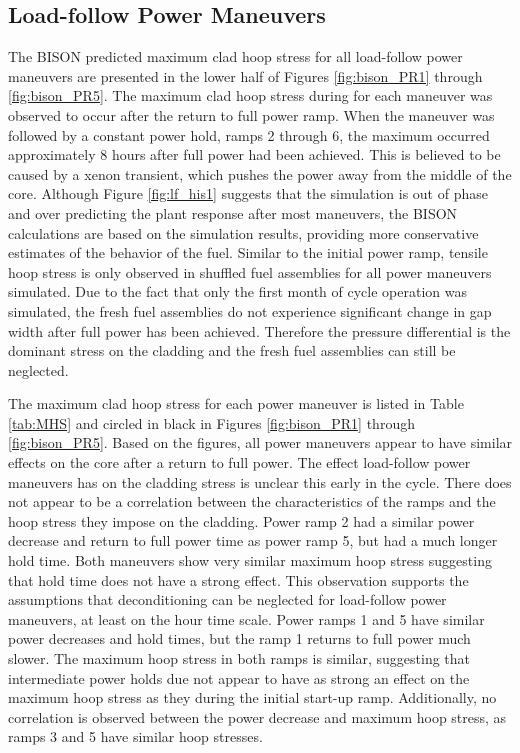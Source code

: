 \documentclass[edeposit,fullpage,11pt]{uiucthesis2009}
\begin{document}
\subsection{Load-follow Power Maneuvers}

The BISON predicted maximum clad hoop stress for all load-follow power maneuvers are presented in the lower half of Figures \ref{fig:bison_PR1} through \ref{fig:bison_PR5}.
The maximum clad hoop stress during for each maneuver was observed to occur after the return to full power ramp.
When the maneuver was followed by a constant power hold, ramps 2 through 6, the maximum occurred approximately 8 hours after full power had been achieved.
This is believed to be caused by a xenon transient, which pushes the power away from the middle of the core.
Although Figure \ref{fig:lf_his1} suggests that the simulation is out of phase and over predicting the plant response after most maneuvers, the BISON calculations are based on the simulation results, providing more conservative estimates of the behavior of the fuel.
Similar to the initial power ramp, tensile hoop stress is only observed in shuffled fuel assemblies for all power maneuvers simulated.
Due to the fact that only the first month of cycle operation was simulated, the fresh fuel assemblies do not experience significant change in gap width after full power has been achieved.
Therefore the pressure differential is the dominant stress on the cladding and the fresh fuel assemblies can still be neglected.

The maximum clad hoop stress for each power maneuver is listed in Table \ref{tab:MHS} and circled in black in Figures \ref{fig:bison_PR1} through \ref{fig:bison_PR5}. 
Based on the figures, all power maneuvers appear to have similar effects on the core after a return to full power.
The effect load-follow power maneuvers has on the cladding stress is unclear this early in the cycle.
There does not appear to be a correlation between the characteristics of the ramps and the hoop stress they impose on the cladding.
Power ramp 2 had a similar power decrease and return to full power time as power ramp 5, but had a much longer hold time.
Both maneuvers show very similar maximum hoop stress suggesting that hold time does not have a strong effect.
This observation supports the assumptions that deconditioning can be neglected for load-follow power maneuvers, at least on the hour time scale.
Power ramps 1 and 5 have similar power decreases and hold times, but the ramp 1 returns to full power much slower.
The maximum hoop stress in both ramps is similar, suggesting that intermediate power holds due not appear to have as strong an effect on the maximum hoop stress as they during the initial start-up ramp.
Additionally, no correlation is observed between the power decrease and maximum hoop stress, as ramps 3 and 5 have similar hoop stresses.
\end{document}
